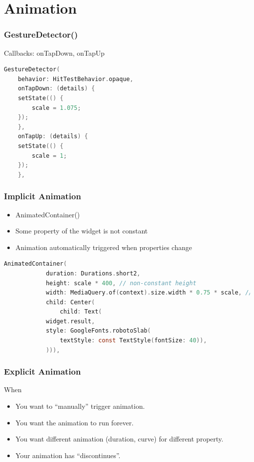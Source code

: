 \documentclass[compress, aspectratio=32]{beamer}
\begin{document}
\section{Animation}
\begin{frame}[fragile]
    \frametitle{GestureDetector()}
    Callbacks: onTapDown, onTapUp
    \begin{lstlisting}[language=c, firstnumber=201]
GestureDetector(
    behavior: HitTestBehavior.opaque,
    onTapDown: (details) {
    setState(() {
        scale = 1.075;
    });
    },
    onTapUp: (details) {
    setState(() {
        scale = 1;
    });
    },
    \end{lstlisting}
\end{frame}
\begin{frame}[fragile]
    \frametitle{Implicit Animation}
    \begin{itemize}
        \item AnimatedContainer()
        \item Some property of the widget is not constant
        \item Animation automatically triggered when properties change
    \end{itemize}
    \begin{lstlisting}[language=c, firstnumber=219]
AnimatedContainer(
            duration: Durations.short2,
            height: scale * 400, // non-constant height
            width: MediaQuery.of(context).size.width * 0.75 * scale, // non-constant width
            child: Center(
                child: Text(
            widget.result,
            style: GoogleFonts.robotoSlab(
                textStyle: const TextStyle(fontSize: 40)),
            ))),
    \end{lstlisting}
\end{frame}
\begin{frame}
    \frametitle{Explicit Animation}
    When
    \begin{itemize}
        \item You want to ``manually'' trigger animation.
        \item You want the animation to run forever.
        \item You want different animation (duration, curve) for different property.
        \item Your animation has ``discontinues''.
    \end{itemize}
\end{frame}
\end{document}
